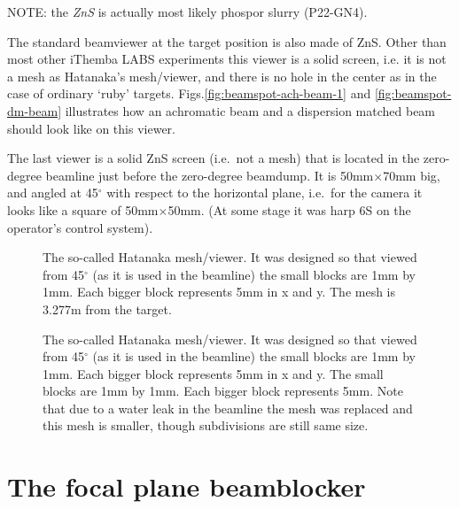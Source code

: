 \documentclass[11pt]{report}
\begin{document}
NOTE: the {\it ZnS} is actually most likely phospor slurry (P22-GN4).

The standard beamviewer at the target position is also made of ZnS. Other than most
other iThemba LABS experiments this viewer is a solid screen, i.e. it is not a mesh as Hatanaka's mesh/viewer, and there is no hole in the center as in the case of ordinary `ruby' targets.  Figs.\ref{fig:beamspot-ach-beam-1} and \ref{fig:beamspot-dm-beam} illustrates how an achromatic beam and a dispersion matched beam should look like on this viewer.

The last viewer is a solid ZnS screen (i.e.~not a mesh) that is located in the 
zero-degree beamline just before the zero-degree beamdump. 
It is 50mm$\times$70mm big, and angled at 45$^{\circ}$ with respect to the horizontal plane, i.e.~for the camera it looks like
a square of 50mm$\times$50mm.
(At some stage it was harp 6S on the operator's control system).

\bigskip
{}


\begin{figure}[!ht]
\centerline{\vspace{0cm}\hspace{0cm}
}
\centering
\caption{The so-called Hatanaka mesh/viewer. It was designed so that viewed from 45$^{\circ}$
(as it is used in the beamline) the small blocks are 1mm by 1mm. 
Each bigger block represents 5mm in x and y. The mesh is 3.277m from the target.}
\label{fig:hatanaka-1}
\end{figure} 

\begin{figure}[!ht]
\centerline{\vspace{0cm}\hspace{0cm}
}
\centering
\caption{The so-called Hatanaka mesh/viewer. It was designed so that viewed from 45$^{\circ}$
(as it is used in the beamline) the small blocks are 1mm by 1mm. 
Each bigger block represents 5mm in x and y.
The small blocks are 1mm by 1mm. Each bigger block represents 5mm.
Note that due to a water leak in the beamline the mesh was replaced and this mesh is smaller, though subdivisions are still same size.}
\label{fig:hatanaka-2}
\end{figure} 


\section{The focal plane beamblocker}\label{sec:fpbs}
\end{document}
